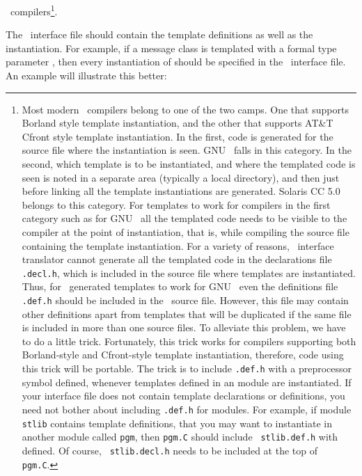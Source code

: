 \CC\ compilers\footnote{ Most modern \CC\ compilers belong to one of the two
camps. One that supports Borland style template instantiation, and the other
that supports AT\&T Cfront style template instantiation. In the first, code is
generated for the source file where the instantiation is seen.  GNU \CC\ falls
in this category.  In the second, which template is to be instantiated, and
where the templated code is seen is noted in a separate area (typically a local
directory), and then just before linking all the template instantiations are
generated. Solaris CC 5.0 belongs to this category. For templates to work for
compilers in the first category such as for GNU \CC\ all the templated code
needs to be visible to the compiler at the point of instantiation, that is,
while compiling the source file containing the template instantiation. For a
variety of reasons, \charmpp\ interface translator cannot generate all the
templated code in the declarations file {\tt *.decl.h}, which is included in
the source file where templates are instantiated. Thus, for \charmpp\ generated
templates to work for GNU \CC\ even the definitions file {\tt *.def.h} should
be included in the \CC\ source file. However, this file may contain other
definitions apart from templates that will be duplicated if the same file is
included in more than one source files. To alleviate this problem, we have to
do a little trick. Fortunately, this trick works for compilers supporting both
Borland-style and Cfront-style template instantiation, therefore, code using
this trick will be portable. The trick is to include {\tt *.def.h} with a
preprocessor symbol  defined, whenever templates
defined in an  module are instantiated. If your interface file does
not contain template declarations or definitions, you need not bother about
including {\tt *.def.h} for  modules.  For example, if module {\tt
stlib} contains template definitions, that you may want to instantiate in
another module called {\tt pgm}, then {\tt pgm.C} should include {\tt
stlib.def.h} with  defined. Of course, {\tt
stlib.decl.h} needs to be included at the top of {\tt pgm.C}.  }. 

The \charmpp\ interface file should contain the template
definitions as well as the instantiation. For example, if a message
class  is templated with a formal type parameter 
, then every instantiation of  should be specified
in the \charmpp\ interface file. An example will illustrate this better:

